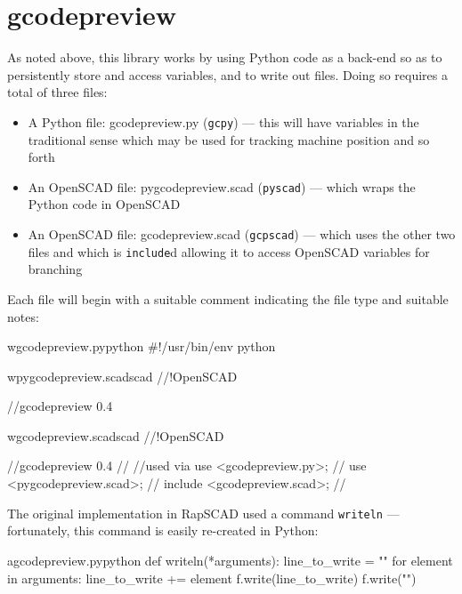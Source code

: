 \documentclass{ltxdoc}
\begin{document}
\clearpage
\section{gcodepreview}

As noted above, this library works by using Python code as a back-end so as to persistently
store and access variables, and to write out files. Doing so requires a total of three files:

\begin{itemize}
\item A Python file: gcodepreview.py (\texttt{gcpy}) --- this will have variables in the 
      traditional sense which may be used for tracking machine position and so forth
\item An OpenSCAD file: pygcodepreview.scad (\texttt{pyscad}) --- which wraps the Python code 
      in OpenSCAD
\item An OpenSCAD file: gcodepreview.scad (\texttt{gcpscad}) --- which uses the other two files 
      and which is \texttt{include}d allowing it to access OpenSCAD variables for branching   
\end{itemize}
 
Each file will begin with a suitable comment indicating the file type and suitable notes:

\begin{writecode}{w}{gcodepreview.py}{python}
#!/usr/bin/env python

\end{writecode}
\addtocounter{gcpy}{3}

\begin{writecode}{w}{pygcodepreview.scad}{scad}
//!OpenSCAD
 
//gcodepreview 0.4

\end{writecode}
\addtocounter{pyscad}{5}

\begin{writecode}{w}{gcodepreview.scad}{scad}
//!OpenSCAD
 
//gcodepreview 0.4
//
//used via use <gcodepreview.py>;
//         use <pygcodepreview.scad>;
//         include <gcodepreview.scad>;
//

\end{writecode}
\addtocounter{gcpscad}{10}

The original implementation in RapSCAD used a command \texttt{writeln} 
--- fortunately, this command is easily re-created in Python:

\lstset{firstnumber=\thegcpy}
\begin{writecode}{a}{gcodepreview.py}{python}
def writeln(*arguments):
    line_to_write = ""
    for element in arguments:
        line_to_write += element
    f.write(line_to_write)
    f.write("\n")
    
\end{writecode}
\addtocounter{gcpy}{7}
\end{document}
